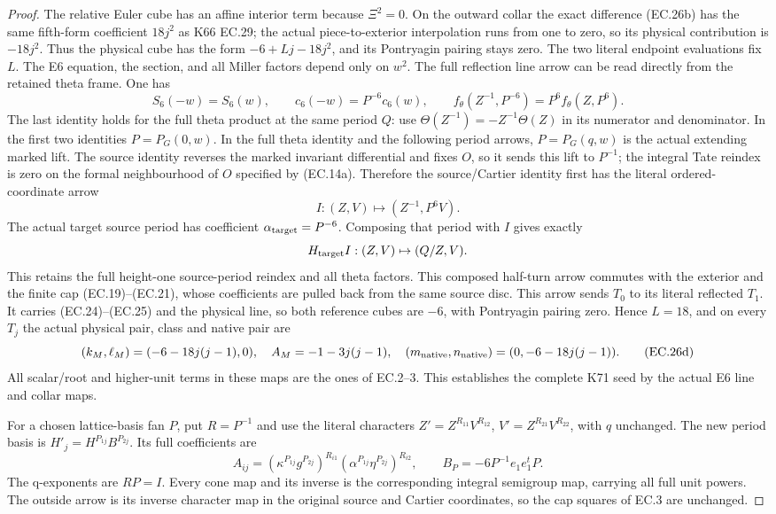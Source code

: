 \begin{proof}
The relative Euler cube has an affine interior term because
\(\Xi^2=0\). On the outward collar the exact difference (EC.26b)
has the same fifth-form coefficient \(18j^2\) as K66 EC.29;
the actual piece-to-exterior interpolation runs from one to zero,
so its physical contribution is \(-18j^2\). Thus the physical
cube has the form \(-6+Lj-18j^2\), and its Pontryagin pairing
stays zero. The two literal endpoint evaluations fix \(L\).
The E6 equation, the section, and all Miller factors depend only
on \(w^2\). The full reflection line arrow can be read directly
from the retained theta frame. One has
\[
 S_6(-w)=S_6(w),\qquad c_6(-w)=P^{-6}c_6(w),\qquad
 f_\theta(Z^{-1},P^{-6})=P^6f_\theta(Z,P^6).
\]
The last identity holds for the full theta product at the same
period \(Q\): use
\(\Theta(Z^{-1})=-Z^{-1}\Theta(Z)\) in its numerator and
denominator. In the first two identities \(P=P_G(0,w)\).
In the full theta identity and the following period arrows,
\(P=P_G(q,w)\) is the actual extending marked lift. The source
identity reverses the marked invariant differential and fixes
\(O\), so it sends this lift to \(P^{-1}\); the integral
Tate reindex is zero on the formal neighbourhood of \(O\)
specified by (EC.14a). Therefore the source/Cartier identity first has
the literal ordered-coordinate arrow
\[
 I:(Z,V)\mapsto(Z^{-1},P^6V).
\]
The actual target source period has coefficient
\(\alpha_{\rm target}=P^{-6}\). Composing that period with \(I\)
gives exactly
\[
 H_{\rm target} I:(Z,V)\mapsto(Q/Z,V).
\]
This retains the full height-one source-period reindex and all
theta factors. This composed half-turn arrow commutes with the
exterior and the finite cap (EC.19)--(EC.21), whose coefficients
are pulled back from the same source disc. This arrow sends
\(T_0\) to its literal reflected \(T_1\). It carries (EC.24)--(EC.25)
and the physical line, so both reference cubes are \(-6\), with
Pontryagin pairing zero. Hence \(L=18\), and on every \(T_j\)
the actual physical pair, class and native pair are
\[
 (k_M,\ell_M)=(-6-18j(j-1),0),\quad
 A_M=-1-3j(j-1),\quad(m_{\rm native},n_{\rm native})
       =(0,-6-18j(j-1)).
 \tag{EC.26d}
\]
All scalar/root and higher-unit terms in these maps are the ones
of EC.2--3. This establishes the complete K71 seed by the actual
E6 line and collar maps.

For a chosen lattice-basis fan \(P\), put \(R=P^{-1}\) and use
the literal characters \(Z'=Z^{R_{11}}V^{R_{12}}\),
\(V'=Z^{R_{21}}V^{R_{22}}\), with \(q\) unchanged. The new period
basis is \(H'_j=H^{P_{1j}}B^{P_{2j}}\). Its full coefficients are
\[
 A_{ij}=(\kappa^{P_{1j}}g^{P_{2j}})^{R_{i1}}
              (\alpha^{P_{1j}}\eta^{P_{2j}})^{R_{i2}},
 \qquad B_P=-6P^{-1}e_1e_1^tP.
 \tag{EC.26}
\]
The q-exponents are \(RP=I\). Every cone map and its inverse is
the corresponding integral semigroup map, carrying all full unit
powers. The outside arrow is its inverse character map in the
original source and Cartier coordinates, so the cap squares of
EC.3 are unchanged.


\end{proof}
